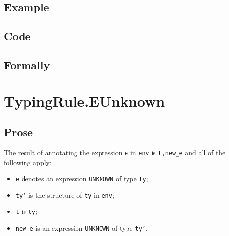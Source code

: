 \documentclass{book}
\newcommand\annotateexpr[1]{\textsf{annotate\_expr}(#1)}
\newcommand\tenv[0]{\texttt{env}}
\newcommand\vt[0]{\texttt{t}}
\newcommand\ve[0]{\texttt{e}}
\begin{document}
  \subsection{Example}

  \subsection{Code}

\begin{emptyformal}
    \subsection{Formally}
\end{emptyformal}


\section{TypingRule.EUnknown \label{sec:TypingRule.EUnknown}}

  \subsection{Prose}
  The result of annotating the expression \texttt{e} in \texttt{env} is
\texttt{t,new\_e} and all of the following apply:
  \begin{itemize}
  \item \texttt{e} denotes an expression \texttt{UNKNOWN} of type \texttt{ty};
  \item \texttt{ty'} is the structure of \texttt{ty} in \texttt{env};
  \item \texttt{t} is \texttt{ty};
  \item \texttt{new\_e} is an expression \texttt{UNKNOWN} of type \texttt{ty'}.
  \end{itemize}
\end{document}
